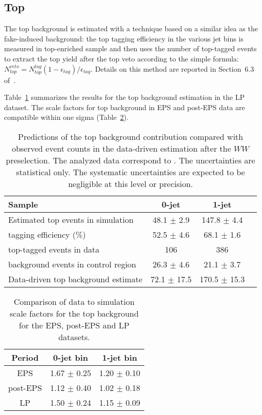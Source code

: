 \subsection{Top}

The top background is estimated with a technique based on a similar idea as the fake-induced background:
the top tagging efficiency in the various jet bins is measured in top-enriched sample and then uses the number of top-tagged events to extract the top yield
after the top veto according to the simple formula: $N_{top}^{veto}=N_{top}^{tag}(1-\epsilon_{tag})/\epsilon_{tag}$.
Details on this method are reported in Section~6.3 of~\cite{epsnote}.

Table~\ref{tab:lp_ttbar_est} summarizes the results for the top background estimation in the LP dataset. 
The scale factors for top background in EPS and post-EPS data are compatible within one sigma (Table~\ref{tab:lp_periods_top}).

\begin{table}[!htbp]
\begin{center}
\begin{tabular}{l c c c}
\hline
Sample                                        &   0-jet          & 1-jet          \\
\hline
Estimated top events in simulation  	      &  48.1 $\pm$ 2.9  & 147.8 $\pm$ 4.4 \\
tagging efficiency (\%)                       &  52.5 $\pm$ 4.6  &  68.1 $\pm$ 1.6 \\
top-tagged events in data           	      &          106     &    386          \\
background events in control region           &  26.3 $\pm$ 4.6  &  21.1 $\pm$ 3.7 \\
Data-driven top background estimate           &  72.1 $\pm$ 17.5 & 170.5 $\pm$ 15.3\\
\hline
\end{tabular}
\caption{Predictions of the top background contribution compared 
with observed event counts in the data-driven estimation after the $WW$ preselection. 
The analyzed data correspond to \lpintlumi.
The uncertainties are statistical only. The systematic uncertainties are expected to be 
negligible at this level or precision.}
\label{tab:lp_ttbar_est}
\end{center}
\end{table}

\begin{table}[!htbp]
\begin{center}
\begin{tabular}{c c c} 
\hline
Period & 0-jet bin & 1-jet bin \\ 
\hline
EPS      & 1.67 $\pm$ 0.25 & 1.20 $\pm$ 0.10 \\
post-EPS & 1.12 $\pm$ 0.40 & 1.02 $\pm$ 0.18 \\
LP       & 1.50 $\pm$ 0.24 & 1.15 $\pm$ 0.09 \\
\hline
\end{tabular}
\caption{Comparison of data to simulation scale factors for the top background for the EPS, post-EPS and LP datasets.}
\label{tab:lp_periods_top}
\end{center}
\end{table}

